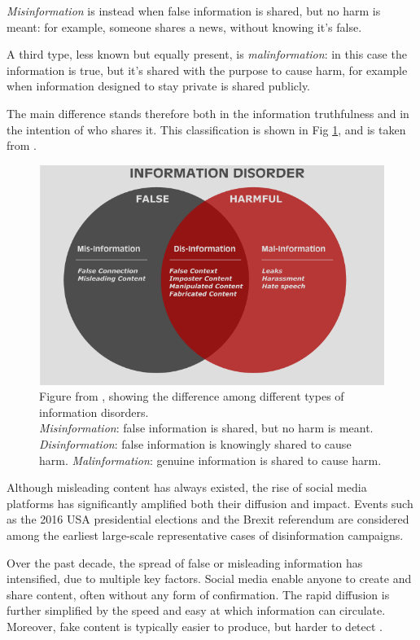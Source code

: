 \textit{Misinformation} is instead when false information is shared, but no harm is meant: for example, someone shares a news, without knowing it's false.

A third type, less known but equally present, is \textit{malinformation}: in this case the information is true, but it's shared with the purpose to cause harm, for example when information designed to stay private is shared publicly.

The main difference stands therefore both in the information truthfulness and in the intention of who shares it. This classification is shown in Fig \ref{fig:info_disorder}, and is taken from \cite{wardle2017information}.

\begin{figure}[h]
    \centering
    \includegraphics[width=0.5\linewidth]{Images/information_disorder_Wardle.png}
    \caption{Figure from \cite{wardle2017information}, showing the difference among different types of information disorders.\\
    \textit{Misinformation}: false information is shared, but no harm is meant. \textit{Disinformation}: false information is knowingly shared to cause harm. \textit{Malinformation}: genuine information is shared to cause harm.}
    \label{fig:info_disorder}
\end{figure}


Although misleading content has always existed, the rise of social media platforms has significantly amplified both their diffusion and impact. 
Events such as the 2016 USA presidential elections and the Brexit referendum are considered among the earliest large-scale representative cases of disinformation campaigns.

Over the past decade, the spread of false or misleading information has intensified, due to multiple key factors.
Social media enable anyone to create and share content, often without any form of confirmation. The rapid diffusion is further simplified by the speed and easy at which information can circulate.
Moreover, fake content is typically easier to produce, but harder to detect \cite{aimeur2023fake}. 

